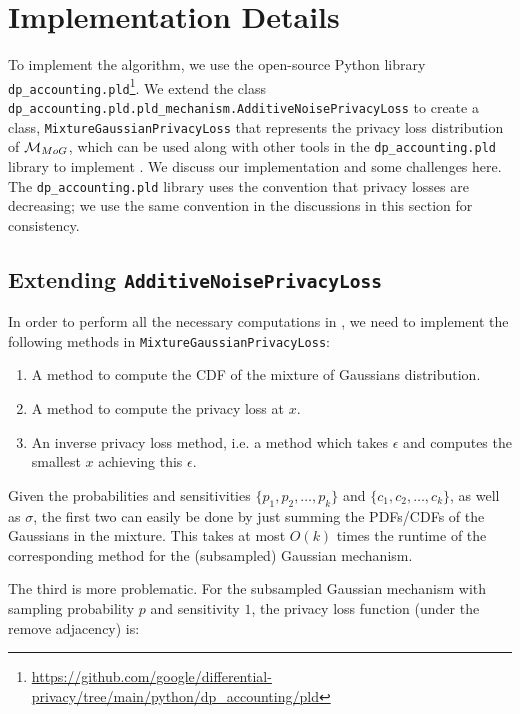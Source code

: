 \section{Implementation Details}\label{sec:implementation}

To implement the \CPTB{} algorithm, we use the open-source Python library \texttt{dp\_accounting.pld}\footnote{\url{https://github.com/google/differential-privacy/tree/main/python/dp_accounting/pld}}. We extend the class \texttt{dp\_accounting.pld.pld\_mechanism.AdditiveNoisePrivacyLoss} to create a class, \texttt{MixtureGaussianPrivacyLoss} that represents the privacy loss distribution of $\mathcal{M}_{MoG}$, which can be used along with other tools in the \texttt{dp\_accounting.pld} library to implement \CPTB{}. We discuss our implementation and some challenges here. The \texttt{dp\_accounting.pld} library uses the convention that privacy losses are decreasing; we use the same convention in the discussions in this section for consistency.

\subsection{Extending \texttt{AdditiveNoisePrivacyLoss}}

In order to perform all the necessary computations in \CPTB{}, we need to implement the following methods in \texttt{MixtureGaussianPrivacyLoss}:

\begin{enumerate}
\item A method to compute the CDF of the mixture of Gaussians distribution.
\item A method to compute the privacy loss at $x$.
\item An inverse privacy loss method, i.e. a method which takes $\epsilon$ and computes the smallest $x$ achieving this $\epsilon$.
\end{enumerate}

Given the probabilities and sensitivities $\{p_1, p_2, \ldots, p_k\}$ and $\{c_1, c_2, \ldots, c_k\}$, as well as $\sigma$, the first two can easily be done by just summing the PDFs/CDFs of the Gaussians in the mixture. This takes at most $O(k)$ times the runtime of the corresponding method for the (subsampled) Gaussian mechanism.

The third is more problematic. For the subsampled Gaussian mechanism with sampling probability $p$ and sensitivity $1$, the privacy loss function (under the remove adjacency) is:


